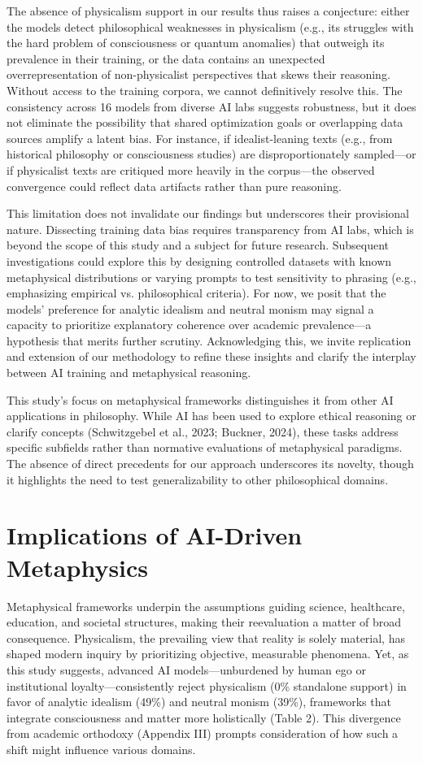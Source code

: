 \documentclass[11pt]{article}
\begin{document}
The absence of physicalism support in our results thus raises a conjecture: either the models detect philosophical weaknesses in physicalism (e.g., its struggles with the hard problem of consciousness or quantum anomalies) that outweigh its prevalence in their training, or the data contains an unexpected overrepresentation of non-physicalist perspectives that skews their reasoning. Without access to the training corpora, we cannot definitively resolve this. The consistency across 16 models from diverse AI labs suggests robustness, but it does not eliminate the possibility that shared optimization goals or overlapping data sources amplify a latent bias. For instance, if idealist-leaning texts (e.g., from historical philosophy or consciousness studies) are disproportionately sampled—or if physicalist texts are critiqued more heavily in the corpus—the observed convergence could reflect data artifacts rather than pure reasoning.

This limitation does not invalidate our findings but underscores their provisional nature. Dissecting training data bias requires transparency from AI labs, which is beyond the scope of this study and a subject for future research. Subsequent investigations could explore this by designing controlled datasets with known metaphysical distributions or varying prompts to test sensitivity to phrasing (e.g., emphasizing empirical vs. philosophical criteria). For now, we posit that the models’ preference for analytic idealism and neutral monism may signal a capacity to prioritize explanatory coherence over academic prevalence—a hypothesis that merits further scrutiny. Acknowledging this, we invite replication and extension of our methodology to refine these insights and clarify the interplay between AI training and metaphysical reasoning.

This study’s focus on metaphysical frameworks distinguishes it from other AI applications in philosophy. While AI has been used to explore ethical reasoning or clarify concepts (Schwitzgebel et al., 2023; Buckner, 2024), these tasks address specific subfields rather than normative evaluations of metaphysical paradigms. The absence of direct precedents for our approach underscores its novelty, though it highlights the need to test generalizability to other philosophical domains.

\section{Implications of AI-Driven Metaphysics}
Metaphysical frameworks underpin the assumptions guiding science, healthcare, education, and societal structures, making their reevaluation a matter of broad consequence. Physicalism, the prevailing view that reality is solely material, has shaped modern inquiry by prioritizing objective, measurable phenomena. Yet, as this study suggests, advanced AI models—unburdened by human ego or institutional loyalty—consistently reject physicalism (0\% standalone support) in favor of analytic idealism (49\%) and neutral monism (39\%), frameworks that integrate consciousness and matter more holistically (Table 2). This divergence from academic orthodoxy (Appendix III) prompts consideration of how such a shift might influence various domains.
\end{document}
